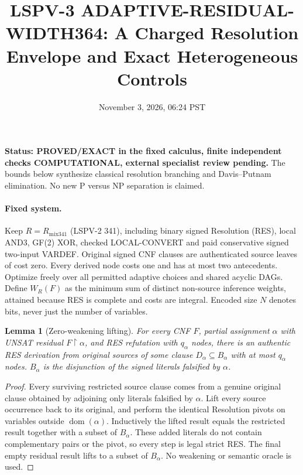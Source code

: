 \documentclass[11pt]{article}
\title{LSPV-3 ADAPTIVE-RESIDUAL-WIDTH364: A Charged Resolution Envelope and Exact Heterogeneous Controls}
\date{November 3, 2026, 06:24 PST}
\newtheorem{lemma}{Lemma}
\begin{document}
\maketitle
\noindent\textbf{Status: PROVED/EXACT in the fixed calculus, finite independent checks COMPUTATIONAL, external specialist review pending.}
The bounds below synthesize classical resolution branching and Davis--Putnam elimination. No new P versus NP separation is claimed.

\paragraph{Fixed system.}
Keep $R=R_{\mathrm{mix341}}$ (LSPV-2 341), including binary signed Resolution (RES), local AND3, GF(2) XOR, checked LOCAL-CONVERT and paid conservative signed two-input VARDEF. Original signed CNF clauses are authenticated source leaves of cost zero. Every derived node costs one and has at most two antecedents. Optimize freely over all permitted adaptive choices and shared acyclic DAGs. Define $W_R(F)$ as the minimum sum of distinct non-source inference weights, attained because RES is complete and costs are integral. Encoded size $N$ denotes bits, never just the number of variables.

\begin{lemma}[Zero-weakening lifting]
For every CNF $F$, partial assignment $\alpha$ with UNSAT residual $F\upharpoonright\alpha$, and RES refutation with $q_\alpha$ nodes, there is an authentic RES derivation from original sources of some clause $D_\alpha\subseteq B_\alpha$ with at most $q_\alpha$ nodes. $B_\alpha$ is the disjunction of the signed literals falsified by $\alpha$.
\end{lemma}
\begin{proof}
Every surviving restricted source clause comes from a genuine original clause obtained by adjoining only literals falsified by $\alpha$. Lift every source occurrence back to its original, and perform the identical Resolution pivots on variables outside $\operatorname{dom}(\alpha)$. Inductively the lifted result equals the restricted result together with a subset of $B_\alpha$. These added literals do not contain complementary pairs or the pivot, so every step is legal strict RES. The final empty residual result lifts to a subset of $B_\alpha$. No weakening or semantic oracle is used.
\end{proof}
\end{document}
